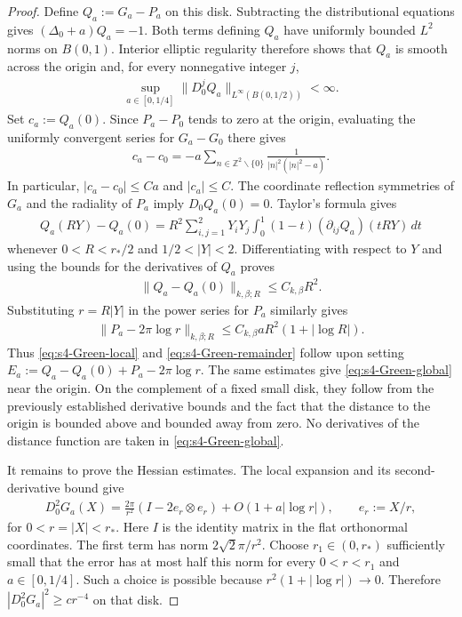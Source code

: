 \documentclass[a4paper,11pt,oneside,reqno]{amsart}
\numberwithin{equation}{section}
\theoremstyle{definition}
\begin{document}
\begin{proof}
    Define $Q_a:=G_a-P_a$ on this disk. Subtracting the
    distributional equations gives $(\Delta_0+a)Q_a=-1$.
    Both terms defining $Q_a$ have uniformly bounded
    $L^2$ norms on $B(0,1)$. Interior elliptic regularity
    therefore shows that $Q_a$ is smooth across the origin
    and, for every nonnegative integer $j$,
    \begin{align*}
        \sup_{a\in[0,1/4]}
        \|D_0^jQ_a\|_{L^\infty(B(0,1/2))}<\infty.
    \end{align*}
    Set $c_a:=Q_a(0)$. Since $P_a-P_0$ tends to zero at
    the origin, evaluating the uniformly convergent series
    for $G_a-G_0$ there gives
    \begin{align*}
        c_a-c_0
        =-a\sum_{n\in\mathbb Z^2\smallsetminus\{0\}}
        \frac1{|n|^2(|n|^2-a)}.
    \end{align*}
    In particular, $|c_a-c_0|\leq Ca$ and $|c_a|\leq C$.
    The coordinate reflection symmetries of $G_a$ and the
    radiality of $P_a$ imply $D_0Q_a(0)=0$. Taylor's
    formula gives
    \begin{align*}
        Q_a(RY)-Q_a(0)
        =R^2\sum_{i,j=1}^2Y_iY_j
        \int_0^1(1-t)(\partial_{ij}Q_a)(tRY)\,dt
    \end{align*}
    whenever $0<R<r_*/2$ and $1/2<|Y|<2$.
    Differentiating with respect to $Y$ and using the
    bounds for the derivatives of $Q_a$ proves
    \begin{align*}
        \|Q_a-Q_a(0)\|_{k,\beta;R}\leq C_{k,\beta}R^2.
    \end{align*}
    Substituting $r=R|Y|$ in the power series for $P_a$
    similarly gives
    \begin{align*}
        \|P_a-2\pi\log r\|_{k,\beta;R}
        \leq C_{k,\beta}aR^2(1+|\log R|).
    \end{align*}
    Thus \eqref{eq:s4-Green-local} and
    \eqref{eq:s4-Green-remainder} follow upon setting
    $E_a:=Q_a-Q_a(0)+P_a-2\pi\log r$.
    The same estimates give \eqref{eq:s4-Green-global}
    near the origin. On the complement of a fixed small
    disk, they follow from the previously established
    derivative bounds and the fact that the distance to
    the origin is bounded above and bounded away from zero.
    No derivatives of the distance function are taken
    in \eqref{eq:s4-Green-global}.

    It remains to prove the Hessian estimates. The local
    expansion and its second-derivative bound give
    \begin{align*}
        D_0^2G_a(X)
        =\frac{2\pi}{r^2}(I-2e_r\otimes e_r)
        +O(1+a|\log r|),
        \qquad e_r:=X/r,
    \end{align*}
    for $0<r=|X|<r_*$. Here $I$ is the identity matrix
    in the flat orthonormal coordinates. The first term
    has norm $2\sqrt2\pi/r^2$. Choose
    $r_1\in(0,r_*)$ sufficiently small that the error
    has at most half this norm for every $0<r<r_1$ and
    $a\in[0,1/4]$. Such a choice is possible because
    $r^2(1+|\log r|)\to0$. Therefore
    $|D_0^2G_a|^2\geq cr^{-4}$ on that disk.


\end{proof}
\end{document}
